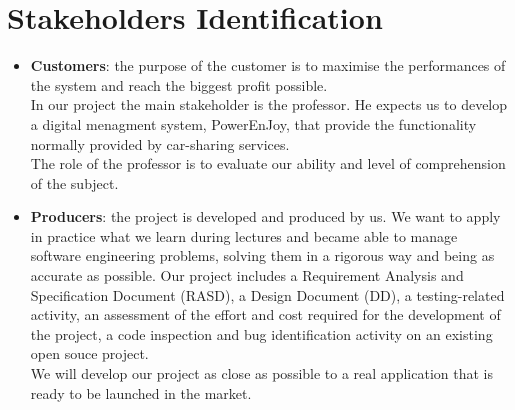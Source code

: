 \section{Stakeholders Identification}
\begin{itemize}
	\item{{\bf Customers}: the purpose of the customer is to maximise the performances of the system and reach the biggest profit possible.
	\\In our project the main stakeholder is the professor. He expects us to develop a digital menagment system, PowerEnJoy, that provide the functionality normally provided by car-sharing services.  
	\\The role of the professor is to evaluate our ability and level of comprehension of the subject.}
	\item{{\bf Producers}: the project is developed and produced by us. We want to apply in practice what we learn during lectures and became able to manage software engineering problems, solving them in a rigorous way and being as accurate as possible. Our project includes a Requirement Analysis and Specification Document (RASD), a Design Document (DD), a testing-related activity, an
	assessment of the effort and cost required for the development of the project, a code inspection and bug identification activity on an existing open souce project. 
	\\We will develop our project as close as possible to a real application that is ready to be launched in the market.}
\end{itemize}
